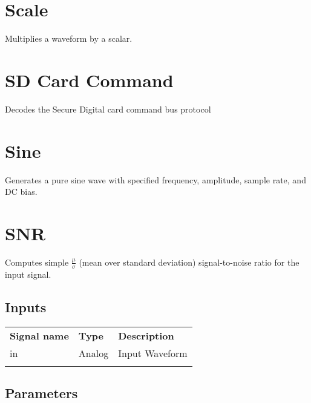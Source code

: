 \pagebreak
\section{Scale}

Multiplies a waveform by a scalar.

\pagebreak
\section{SD Card Command}

Decodes the Secure Digital card command bus protocol

\pagebreak
\section{Sine}

Generates a pure sine wave with specified frequency, amplitude, sample rate, and DC bias.

\pagebreak
\section{SNR}
Computes simple $\frac{\mu}{\sigma}$ (mean over standard deviation) signal-to-noise ratio for the input signal.

\subsection{Inputs}

\begin{tabularx}{16cm}{llX}
\thickhline
\textbf{Signal name} & \textbf{Type} & \textbf{Description} \\
\thickhline
in & Analog & Input Waveform \\
\thickhline
\end{tabularx}

\subsection{Parameters}

